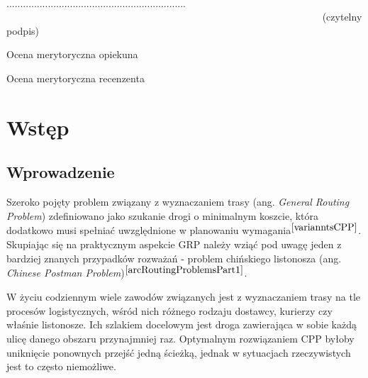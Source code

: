 \documentclass[a4paper, 12pt, twoside, openright]{article}
\begin{document}
\begin{center}

~~~~~~~~~~~~~~~~~~~~~~~~~~~~~~~~~~~~~~~~~~~~~~~~~~~~~~~~~~~~~~~~~ 
................................................................. \\
~~~~~~~~~~~~~~~~~~~~~~~~~~~~~~~~~~~~~~~~~~~~~~~~~~~~~~~~~~~~~~~  {\sf (czytelny podpis)} \\

\end{center}



\newpage
\linespread{1.3}
\selectfont

\hspace*{\fill}\large{Ocena merytoryczna opiekuna}

\vspace{85mm}

\newpage
\linespread{1.3}
\selectfont

\hspace*{\fill}\large{Ocena merytoryczna recenzenta}

\vspace{85mm}


\newpage
\tableofcontents


\newpage
\section{Wstęp}
\subsection{Wprowadzenie}
	\indent\par
	Szeroko pojęty problem związany z wyznaczaniem trasy (ang. \textit{General Routing Problem}) zdefiniowano jako szukanie drogi o minimalnym koszcie, która dodatkowo musi spełniać uwzględnione w planowaniu wymagania$^{\cite{varianntsCPP}}$.
	Skupiając się na praktycznym aspekcie GRP należy wziąć pod uwagę jeden z bardziej znanych przypadków rozważań - problem chińskiego listonosza (ang. \textit{Chinese Postman Problem})$^{\cite{arcRoutingProblemsPart1}}$. 


	W życiu codziennym wiele zawodów związanych jest z wyznaczaniem trasy na tle procesów logistycznych, wśród nich różnego rodzaju dostawcy, kurierzy czy właśnie listonosze. Ich szlakiem docelowym jest droga zawierająca w sobie każdą ulicę danego obszaru przynajmniej raz. Optymalnym rozwiązaniem CPP byłoby uniknięcie ponownych przejść jedną ścieżką, jednak w sytuacjach rzeczywistych jest to często niemożliwe.
\end{document}
